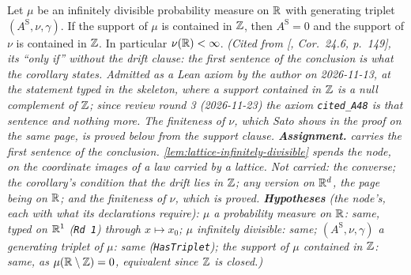 \begin{theorem}
\label{thm:cited-A48}
\leanok
{}
Let $\mu$ be an infinitely divisible probability measure on $\mathbb{R}$ with generating triplet
$(A^{\mathrm S}, \nu, \gamma)$. If the support of $\mu$ is contained in $\mathbb{Z}$, then $A^{\mathrm S} = 0$ and the
support of $\nu$ is contained in $\mathbb{Z}$. In particular $\nu(\mathbb{R}) < \infty$.
\statusA\quad{}\quad\emph{(Cited from [, Cor.~24.6, p.~149], its
``only if'' without the drift clause: the first sentence of the conclusion is what the corollary
states. Admitted as a Lean axiom by the author on 2026-11-13, at the statement typed in the
skeleton, where a support contained in $\mathbb{Z}$ is a null complement of $\mathbb{Z}$; since review round 3
(2026-11-23) the axiom \texttt{cited\_A48} is that sentence and nothing more. The finiteness of
$\nu$, which Sato shows in the proof on the same page, is proved below from the support clause.
\textbf{Assignment.}  carries the first sentence of the conclusion.
\ref{lem:lattice-infinitely-divisible}
spends the node, on the coordinate images of a law carried by a lattice. Not carried: the converse; the
corollary's condition that the drift lies in $\mathbb{Z}$; any version on $\mathbb{R}^d$, the page being on
$\mathbb{R}$; and the finiteness of $\nu$, which is proved.
\textbf{Hypotheses} (the node's, each with what its declarations require): $\mu$ a probability measure
on $\mathbb{R}$: same, typed on $\mathbb{R}^1$ (\texttt{Rd 1}) through $x \mapsto x_0$; $\mu$ infinitely
divisible: same; $(A^{\mathrm S}, \nu, \gamma)$ a generating triplet of $\mu$: same (\texttt{HasTriplet});
the support of $\mu$ contained in $\mathbb{Z}$: same, as $\mu(\mathbb{R} \setminus \mathbb{Z}) = 0$, equivalent since
$\mathbb{Z}$ is closed.)}
\end{theorem}

